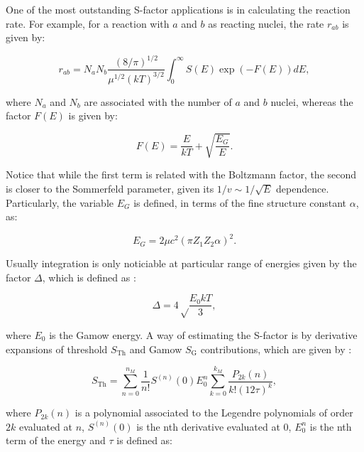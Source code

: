 \documentclass[openany]{book}
\begin{document}
One of the most outstanding S-factor applications is in calculating the reaction rate. For example, for a reaction with $a$ and $b$ as reacting nuclei, the rate $r_{ab}$ is given by:

\begin{equation}\label{eq:sfactor_reactionRate}
	r_{ab} = N_aN_b \frac{(8/\pi)^{1/2}}{\mu^{1/2}(kT)^{3/2}} \int_0^{\infty} {S(E) \exp {(-F(E))} dE},
\end{equation} 

where $N_a$ and $N_b$ are associated with the number of $a$ and $b$ nuclei, whereas the factor $F(E)$ is given by: 

\begin{equation}\label{eq:sfactor_Ffactor}
	F(E) = \frac{E}{kT} + \sqrt{\frac{E_G}{E}}.
\end{equation}

Notice that while the first term is related with the Boltzmann factor, the second is closer to the Sommerfeld parameter, given its $1/v \sim 1/\sqrt{E}$ dependence. Particularly, the variable $E_G$ is defined, in terms of the fine structure constant $\alpha$, as: 

\begin{equation}\label{eq:sfactor_Eg}
	E_G = 2\mu c^2 (\pi Z_1 Z_2 \alpha)^2.
\end{equation}

Usually integration is only noticiable at particular range of energies given by the factor $\Delta$, which is defined as \cite{ueda_sargeant_pato_hussein_2002}: 


\begin{equation}\label{eq:sfactor_delta}
	\Delta = 4 \sqrt \frac{E_0 kT}{3},
\end{equation}

where $E_0$ is the Gamow energy. A way of estimating the S-factor is by derivative expansions of threshold $S_{\mathrm{Th}}$ and Gamow $S_{\mathrm{G}}$ contributions, which are given by \cite{ueda_sargeant_pato_hussein_2002}: 

\begin{equation}\label{eq:sfactor_nonResonant_threshold}
	S_{\mathrm{Th}} =  \sum_{n = 0} ^{n_M} {\frac{1}{n!} S^{(n)} (0) E^{n}_0 \sum_{k=0}^{k_M} {\frac{P_{2k}(n)}{k! (12\tau)^k }} }, 
\end{equation}

where $P_{2k}(n)$ is a polynomial associated to the Legendre polynomials of order $2k$ evaluated at $n$, $S^{(n)}(0)$ is the nth derivative evaluated at 0, $E^n_0$ is the nth term of the energy and $\tau$ is defined as: 
\end{document}
